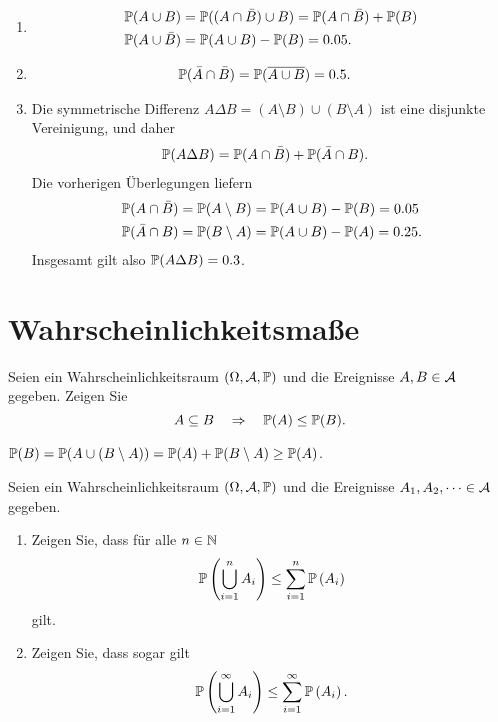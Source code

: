 \solution
\begin{enumerate}
    \item \begin{align*}
            \mathbb P(A \cup B) &= \mathbb P( (A \cap \bar B) \cup B ) = 
            \mathbb P( A \cap \bar B  ) + \mathbb P(B) \\
            \mathbb P(A \cup \bar B) &= \mathbb P(A \cup B) - \mathbb P(B) = 0.05.
        \end{align*}
    \item \begin{align*}
            \mathbb P(\bar A \cap \bar B) &= \mathbb P(\overline{A \cup B}) = 0.5.
        \end{align*}
    \item Die symmetrische Differenz $A \Delta B = (A \setminus B) \cup (B \setminus A)$
        ist eine disjunkte Vereinigung, und daher
        \begin{align*}
            \mathbb P(A \Delta B) &= \mathbb P(A \cap \bar B) + \mathbb P(\bar A \cap B).
        \end{align*}
        Die vorherigen Überlegungen liefern
        \begin{align*}
            \mathbb P( A \cap \bar B) &= \mathbb P(A \setminus B) = \mathbb P(A \cup B) - \mathbb P(B) = 0.05 \\
            \mathbb P( \bar A \cap B) &= \mathbb P(B \setminus A) = \mathbb P(A \cup B) - \mathbb P(A) = 0.25.
        \end{align*}
        Insgesamt gilt also $\mathbb P(A \Delta B) = 0.3$.
\end{enumerate}


\section{Wahrscheinlichkeitsmaße}

 Seien ein Wahrscheinlichkeitsraum \linebreak
$(\Omega, \mathcal A, \mathbb P)$ und die Ereignisse $A,B \in \mathcal A$ gegeben. Zeigen Sie
\begin{equation*}
A \subseteq B \quad  \Rightarrow \quad \mathbb P(A) \leq \mathbb P(B).
\end{equation*}

\solution $\mathbb P(B) = \mathbb P(A \cup (B \setminus A))= \mathbb P(A) + \mathbb P(B\setminus A) \geq \mathbb P(A)$. 


 Seien ein
Wahrscheinlichkeitsraum $(\Omega, \mathcal A, \mathbb P)$ und die Ereignisse $A_1, A_2, \dots
\in \mathcal A$ gegeben. 
\begin{enumerate}
    \item Zeigen Sie, dass für alle  $n\in \mathbb N$ 
        \begin{equation*}
            \mathbb P \left(  \bigcup \limits_{i=1}^n A_i \right) \leq \sum_{i=1}^{n} \mathbb P\left( A_i \right)
        \end{equation*}
        gilt. 

    \item Zeigen Sie, dass sogar gilt 
        \begin{equation*}
            \mathbb P \left(  \bigcup \limits_{i=1}^\infty A_i \right) \leq \sum_{i=1}^{\infty} \mathbb P\left( A_i \right).
        \end{equation*}
\end{enumerate}

